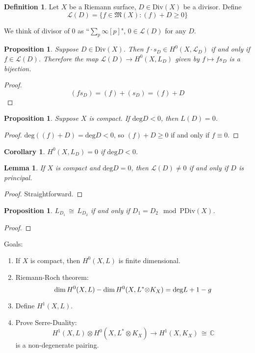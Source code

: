 \documentclass[12pt]{article}
\theoremstyle{plain}
\newtheorem{corollary}[equation]{Corollary}
\newtheorem{lemma}[equation]{Lemma}
\newtheorem{proposition}[equation]{Proposition}
\theoremstyle{definition}
\newtheorem{definition}[equation]{Definition}
\newcommand{\fM}{\mathfrak{M}}
\newcommand{\IC}{\mathbb{C}}
\newcommand{\shL}{\mathscr{L}}
\renewcommand{\deg}{\mathrm{deg}}
\renewcommand\dim{{\rm dim\,}}
\newcommand\iso{{\, \cong \,}}
\newcommand\tensor{{\otimes}}
\newcommand{\<}{\langle}
\renewcommand{\>}{\rangle}
\newcommand{\Div}{\mathrm{Div}}
\newcommand{\PDiv}{\mathrm{PDiv}}
\begin{document}
\begin{definition}
Let $X$ be a Riemann surface, $D \in \Div(X)$ be a divisor. Define 
$$ \shL(D) = \{ f \in \fM(X) : (f) + D \ge 0 \}$$ 
\end{definition}
We think of divisor of $0$ as ``$\sum_p \infty [p]$", $0 \in \shL(D)$ for any $D$. 

\begin{proposition}
Suppose $D \in \Div(X)$. Then $f \cdot s_D \in H^0(X, \shL_D)$ if and only if $f \in \shL(D)$. Therefore the map $\shL(D) \to H^0(X, L_D)$ given by $f \mapsto fs_D$ is a bijection. 
\end{proposition}
\begin{proof}
$$(f s_D) = (f) + (s_D) = (f) + D$$ 
\end{proof}

\begin{proposition}
Suppose $X$ is compact. If $\deg D < 0$, then $L(D) = 0$. 
\end{proposition}
\begin{proof}
$\deg((f) + D) = \deg D < 0$, so $(f) + D \ge 0$ if and only if $f \equiv 0$. 
\end{proof}

\begin{corollary}
$H^0(X, L_D) = 0$ if $\deg D < 0$. 
\end{corollary}

\begin{lemma}
If $X$ is compact and $\deg D = 0$, then $\shL(D) \neq 0$ if and only if $D$ is principal. 
\end{lemma}
\begin{proof}
Straightforward. 
\end{proof}

\begin{proposition}
$L_{D_1} \iso L_{D_2}$ if and only if $D_1 = D_2 \mod \PDiv(X)$. 
\end{proposition}
\begin{proof}

\end{proof}
Goals: 
\begin{enumerate}
\item If $X$ is compact, then $H^0(X, L)$ is finite dimensional. 
\item Riemann-Roch theorem: $$\dim H^0(X, L) - \dim H^0(X, L^* \tensor K_X) = \deg L + 1 - g$$
\item Define $H^1(X, L)$. 
\item Prove Serre-Duality: 
$$ H^1(X, L) \tensor H^0(X, L^* \tensor K_X) \to H^1(X, K_X) \iso \IC $$
is a non-degenerate pairing. 
\end{enumerate}
\end{document}
